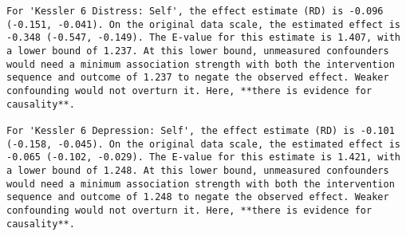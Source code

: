\documentclass[
  singlecolumn]{article}
\begin{document}
\begin{verbatim}
For 'Kessler 6 Distress: Self', the effect estimate (RD) is -0.096 (-0.151, -0.041). On the original data scale, the estimated effect is -0.348 (-0.547, -0.149). The E-value for this estimate is 1.407, with a lower bound of 1.237. At this lower bound, unmeasured confounders would need a minimum association strength with both the intervention sequence and outcome of 1.237 to negate the observed effect. Weaker confounding would not overturn it. Here, **there is evidence for causality**.

For 'Kessler 6 Depression: Self', the effect estimate (RD) is -0.101 (-0.158, -0.045). On the original data scale, the estimated effect is -0.065 (-0.102, -0.029). The E-value for this estimate is 1.421, with a lower bound of 1.248. At this lower bound, unmeasured confounders would need a minimum association strength with both the intervention sequence and outcome of 1.248 to negate the observed effect. Weaker confounding would not overturn it. Here, **there is evidence for causality**.
\end{verbatim}
\end{document}
